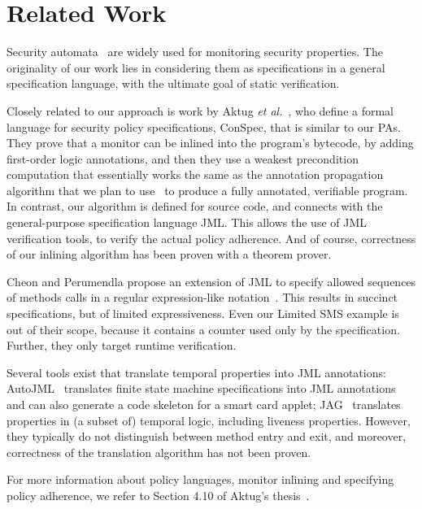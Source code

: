 \section{Related Work}\label{SecRelated}

Security automata~\cite{Schneider99} are widely used for monitoring
security properties. The originality of our work lies in considering
them as specifications in a general specification language, with the
ultimate goal of static verification.

Closely related to our approach is work by Aktug \emph{et
al.}~\cite{Aktug07,Aktug08,AktugDG08}, who define a formal language
for security policy specifications, ConSpec, that is similar to our
PAs.  They prove that a monitor can be inlined into the program's
bytecode, by adding first-order logic annotations, and then they use a
weakest precondition computation that essentially works the same as
the annotation propagation algorithm that we plan to
use~\cite{PavlovaBBHL04} to produce a fully annotated, verifiable
program. In contrast, our algorithm is defined for source code, and
connects with the general-purpose specification language JML. This
allows the use of JML verification tools, to verify the actual policy
adherence. And of course, correctness of our inlining algorithm has
been proven with a theorem prover.

Cheon and Perumendla propose an extension of JML to specify allowed
sequences of methods calls in a regular expression-like
notation~\cite{Cheon07}.  This results in succinct specifications, but
of limited expressiveness. Even our Limited SMS example is out of
their scope, because it contains a counter used only by the
specification. Further, they only target runtime verification.

Several tools exist that translate temporal properties into JML
annotations: AutoJML~\cite{Hubbers03} translates finite state machine
specifications into JML annotations and can also generate a code
skeleton for a smart card applet; JAG~\cite{Giorgetti06} translates
properties in (a subset of) temporal logic, including liveness
properties.  However, they typically do not distinguish between method
entry and exit, and moreover, correctness of the translation algorithm
has not been proven.

For more information about policy languages, monitor inlining and
specifying policy adherence, we refer to Section 4.10 of Aktug's
thesis~\cite{Aktug08}.
